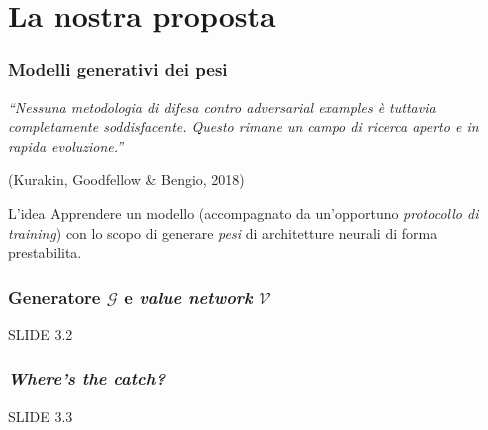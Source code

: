 \documentclass{beamer}
\begin{document}
\section{La nostra proposta}{

\begin{frame}
	\frametitle{Modelli generativi dei pesi}
	\begin{displayquote}
		\textit{``Nessuna metodologia di difesa contro \textit{adversarial examples} è tuttavia completamente soddisfacente. Questo rimane un campo di ricerca aperto e in rapida evoluzione.”}\\
		{\raggedleft(Kurakin, Goodfellow \& Bengio, 2018)\par}
	\end{displayquote}

\hfill\break

\begin{block}{L'idea}
	Apprendere un modello (accompagnato da un'opportuno \textit{protocollo di training}) con lo scopo di \alert{generare \textit{pesi} di architetture neurali} di forma prestabilita.
\end{block}




\end{frame}


\begin{frame}
	\frametitle{Generatore $\mathcal{G}$ e \textit{value network} $\mathcal{V}$}
	SLIDE 3.2
\end{frame}


\begin{frame}
	\frametitle{\textit{Where's the catch?}}
	SLIDE 3.3
\end{frame}

}



\end{document}

